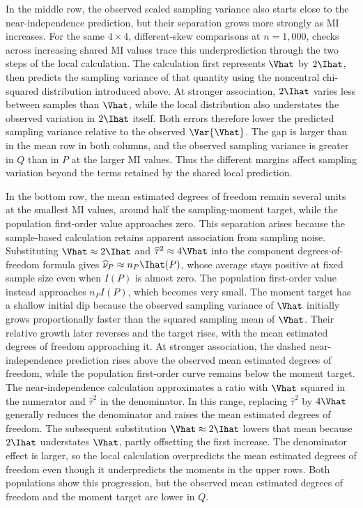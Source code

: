 In the middle row, the observed scaled sampling variance also starts
close to the near-independence prediction, but their separation grows
more strongly as MI increases. For the same \(4\times4\), different-skew
comparisons at \(n=1{,}000\), checks across increasing shared MI values
trace this underprediction through the two steps of the local calculation.
The calculation first
represents \(\Vhat\) by \(2\Ihat\), then predicts the sampling variance
of that quantity using the noncentral chi-squared distribution introduced
above. At stronger association,
\(2\Ihat\) varies less between samples than \(\Vhat\), while the local
distribution also understates the observed variation in \(2\Ihat\)
itself. Both errors therefore lower the predicted sampling variance
relative to the observed \(\Var\{\Vhat\}\).
The gap is larger than in the mean row in both columns, and the observed
sampling variance is greater in \(Q\) than in \(P\) at the larger MI
values.
Thus the different margins affect sampling variation beyond the terms
retained by the shared local prediction.

In the bottom row, the mean estimated degrees of freedom remain several
units at the smallest MI values, around half the sampling-moment target,
while the population first-order value approaches zero. This separation
arises because the sample-based calculation retains apparent association
from sampling noise. Substituting \(\Vhat\approx2\Ihat\) and
\(\widehat\tau^2\approx4\Vhat\) into the component degrees-of-freedom
formula gives
\(\widehat\nu_P\approx n_P\Ihat(P)\), whose average stays positive at
fixed sample size even when \(I(P)\) is almost zero. The population
first-order value instead approaches \(n_PI(P)\), which becomes very
small. The moment target has a shallow initial dip because the observed
sampling variance of \(\Vhat\) initially grows proportionally faster than
the squared sampling mean of \(\Vhat\). Their relative growth later reverses
and the target rises, with the mean estimated degrees of freedom approaching
it. At stronger
association, the dashed near-independence prediction rises above the
observed mean estimated degrees of freedom, while the population
first-order curve remains below the moment target. The near-independence
calculation approximates a ratio with \(\Vhat\) squared in the numerator
and \(\widehat\tau^2\) in the denominator. In this range, replacing
\(\widehat\tau^2\) by \(4\Vhat\) generally reduces the denominator
and raises the mean estimated degrees of freedom. The subsequent
substitution \(\Vhat\approx2\Ihat\) lowers that mean because
\(2\Ihat\) understates \(\Vhat\), partly offsetting the first
increase. The denominator effect is larger, so the local calculation
overpredicts the mean estimated degrees of freedom even though it
underpredicts the moments in the upper rows. Both populations show this progression,
but the observed mean estimated degrees of freedom and the moment target
are lower in \(Q\).

